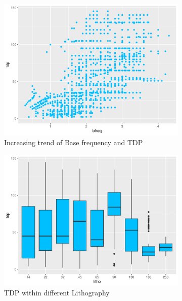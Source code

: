 \begin{figure}[H]
\begin{subfigure}[b]{0.45\textwidth}
        \centering
        \includegraphics[width=\textwidth]{./graphics/scatter_tdp_bfreq.pdf}
        \caption{Increasing trend of Base frequency and TDP}
        \label{fig:tdp_analysis_bfreq}
    \end{subfigure}
    \hfill
    \begin{subfigure}[b]{0.45\textwidth}
        \centering
        \includegraphics[width=\textwidth]{./graphics/box_tdp_litho.pdf}
        \caption{TDP within different Lithography}
        \label{fig:tdp_analysis_litho}
    \end{subfigure}
    \hfill
    \begin{subfigure}[b]{0.45\textwidth}
        \centering

\end{subfigure}
\end{figure}
